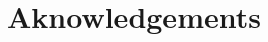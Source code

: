 \documentclass[useAMS,referee,usenatbib]{biom}
\begin{document}
%
%

%
%
%


\backmatter


\section*{Aknowledgements}
\end{document}
